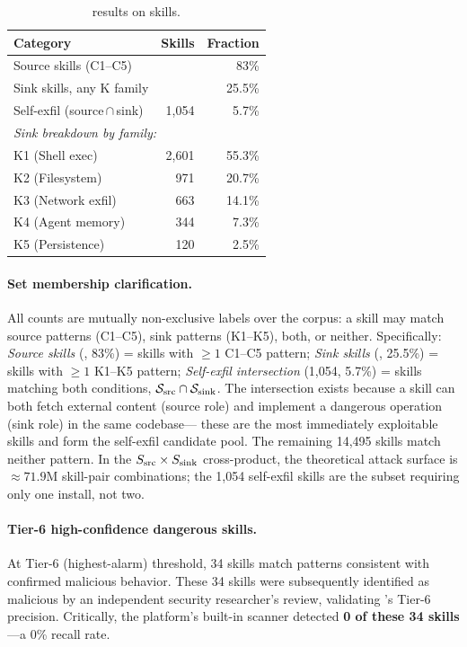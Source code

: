 \begin{table}[t]
\centering
\caption{\lscps results on \NskillsCH{} \clawhub skills.}
\label{tab:lscps_ch}
\setlength{\tabcolsep}{4pt}
\small
\begin{tabular}{lrr}
\toprule
\textbf{Category} & \textbf{Skills} & \textbf{Fraction}\\
\midrule
Source skills (C1--C5)         & \NsrcCH{} & 83\% \\
Sink skills, any K family      &  \NsinkCH{} & 25.5\% \\
Self-exfil (source\,$\cap$\,sink) & 1,054 & 5.7\% \\
\midrule
\multicolumn{3}{l}{\textit{Sink breakdown by family:}}\\
\quad K1 (Shell exec)          &  2,601 & 55.3\% \\
\quad K2 (Filesystem)          &    971 & 20.7\% \\
\quad K3 (Network exfil)       &    663 & 14.1\% \\
\quad K4 (Agent memory)        &    344 &  7.3\% \\
\quad K5 (Persistence)         &    120 &  2.5\% \\
\bottomrule
\end{tabular}
\end{table}

\paragraph{Set membership clarification.}
All counts are mutually non-exclusive labels over the \NskillsCH{} corpus:
a skill may match source patterns (C1--C5), sink patterns (K1--K5), both, or neither.
Specifically:
\emph{Source skills} (\NsrcCH, 83\%) = skills with $\geq 1$ C1--C5 pattern;
\emph{Sink skills} (\NsinkCH, 25.5\%) = skills with $\geq 1$ K1--K5 pattern;
\emph{Self-exfil intersection} (1,054, 5.7\%) = skills matching both conditions,
\ie $\mathcal{S}_{\rm src} \cap \mathcal{S}_{\rm sink}$.
The intersection exists because a skill can both fetch external content (source role)
and implement a dangerous operation (sink role) in the same codebase---
these are the most immediately exploitable skills and form the self-exfil candidate pool.
The remaining 14,495 skills match neither pattern.
In the $S_{\rm src} \times S_{\rm sink}$ cross-product,
the theoretical attack surface is $\approx 71.9\mathrm{M}$ skill-pair combinations;
the 1,054 self-exfil skills are the subset requiring only one install, not two.

\paragraph{Tier-6 high-confidence dangerous skills.}
At Tier-6 (highest-alarm) threshold,
34 skills match patterns consistent with confirmed malicious behavior.
These 34 skills were subsequently identified as malicious
by an independent security researcher's review,
validating \lscps's Tier-6 precision.
Critically, the \clawhub platform's built-in scanner detected
\textbf{0 of these 34 skills}---a 0\% recall rate.

